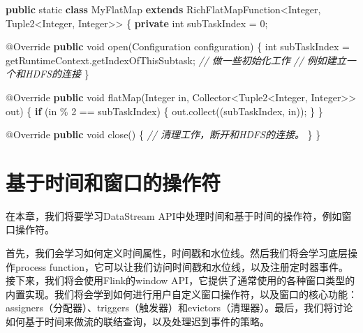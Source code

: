 \documentclass[cn,11pt,chinese]{elegantbook}
\newenvironment{Shaded}{}{}
\newcommand{\AttributeTok}[1]{\textcolor[rgb]{0.49,0.56,0.16}{#1}}
\newcommand{\BuiltInTok}[1]{#1}
\newcommand{\CommentTok}[1]{\textcolor[rgb]{0.38,0.63,0.69}{\textit{#1}}}
\newcommand{\DataTypeTok}[1]{\textcolor[rgb]{0.56,0.13,0.00}{#1}}
\newcommand{\DecValTok}[1]{\textcolor[rgb]{0.25,0.63,0.44}{#1}}
\newcommand{\FunctionTok}[1]{\textcolor[rgb]{0.02,0.16,0.49}{#1}}
\newcommand{\KeywordTok}[1]{\textcolor[rgb]{0.00,0.44,0.13}{\textbf{#1}}}
\newcommand{\NormalTok}[1]{#1}
\begin{document}
\begin{Shaded}
\begin{Highlighting}[]
\KeywordTok{public} \DataTypeTok{static} \KeywordTok{class}\NormalTok{ MyFlatMap }\KeywordTok{extends}\NormalTok{ RichFlatMapFunction\textless{}}\BuiltInTok{Integer}\NormalTok{, Tuple2\textless{}}\BuiltInTok{Integer}\NormalTok{, }\BuiltInTok{Integer}\NormalTok{\textgreater{}\textgreater{} \{}
  \KeywordTok{private} \DataTypeTok{int}\NormalTok{ subTaskIndex = }\DecValTok{0}\NormalTok{;}

  \AttributeTok{@Override}
  \KeywordTok{public} \DataTypeTok{void} \FunctionTok{open}\NormalTok{(}\BuiltInTok{Configuration}\NormalTok{ configuration) \{}
    \DataTypeTok{int}\NormalTok{ subTaskIndex = getRuntimeContext.}\FunctionTok{getIndexOfThisSubtask}\NormalTok{;}
    \CommentTok{// 做一些初始化工作}
    \CommentTok{// 例如建立一个和HDFS的连接}
\NormalTok{  \}}

  \AttributeTok{@Override}
  \KeywordTok{public} \DataTypeTok{void} \FunctionTok{flatMap}\NormalTok{(}\BuiltInTok{Integer}\NormalTok{ in, Collector\textless{}Tuple2\textless{}}\BuiltInTok{Integer}\NormalTok{, }\BuiltInTok{Integer}\NormalTok{\textgreater{}\textgreater{} out) \{}
    \KeywordTok{if}\NormalTok{ (in \% }\DecValTok{2}\NormalTok{ == subTaskIndex) \{}
\NormalTok{      out.}\FunctionTok{collect}\NormalTok{((subTaskIndex, in));}
\NormalTok{    \}}
\NormalTok{  \}}

  \AttributeTok{@Override}
  \KeywordTok{public} \DataTypeTok{void} \FunctionTok{close}\NormalTok{() \{}
    \CommentTok{// 清理工作，断开和HDFS的连接。}
\NormalTok{  \}}
\NormalTok{\}}
\end{Highlighting}
\end{Shaded}

\hypertarget{ux57faux4e8eux65f6ux95f4ux548cux7a97ux53e3ux7684ux64cdux4f5cux7b26}{%
\chapter{基于时间和窗口的操作符}\label{ux57faux4e8eux65f6ux95f4ux548cux7a97ux53e3ux7684ux64cdux4f5cux7b26}}

在本章，我们将要学习DataStream
API中处理时间和基于时间的操作符，例如窗口操作符。

首先，我们会学习如何定义时间属性，时间戳和水位线。然后我们将会学习底层操作process
function，它可以让我们访问时间戳和水位线，以及注册定时器事件。接下来，我们将会使用Flink的window
API，它提供了通常使用的各种窗口类型的内置实现。我们将会学到如何进行用户自定义窗口操作符，以及窗口的核心功能：assigners（分配器）、triggers（触发器）和evictors（清理器）。最后，我们将讨论如何基于时间来做流的联结查询，以及处理迟到事件的策略。
\end{document}
